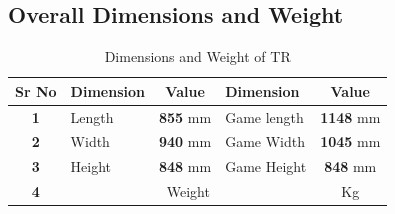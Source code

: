     \subsection{Overall Dimensions and Weight}
        \begin{table}[h]
            \begin{minipage}[t][3.5cm]{\textwidth}
                \begin{minipage}[t]{0.5\textwidth}
                    \centering                
                    \caption{Dimensions and Weight of TR} \label{Dimensions_TR} \small
                    \begin{tabular}{|c|l|c|l|c|}
                        \hline
                        \textbf{Sr No}  & \textbf{Dimension} & \textbf{Value}  & \textbf{Dimension}      & \textbf{Value}   \\ \hline
                        \textbf{1}      & Length             & \textbf{855} mm & Game length             & \textbf{1148} mm \\ \hline
                        \textbf{2}      & Width              & \textbf{940} mm & Game Width              & \textbf{1045} mm \\ \hline
                        \textbf{3}      & Height             & \textbf{848} mm & Game Height             & \textbf{848} mm  \\ \hline
                        \textbf{4}      & \multicolumn{3}{c|}{Weight}                                    & \textbf{} Kg     \\ \hline
                    \end{tabular}
                \end{minipage}
                \hfill

\end{minipage}
\end{table}
